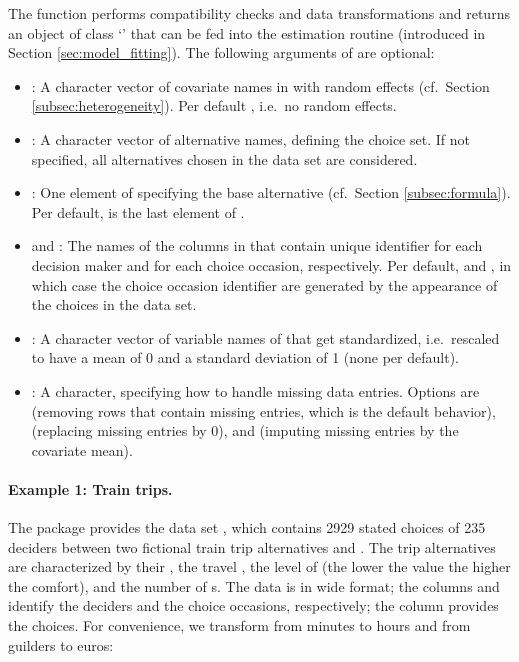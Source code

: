 \documentclass[article]{jss}
\newcommand{\class}[1]{`\code{#1}'}
\newcommand{\fct}[1]{\code{#1()}}
\begin{document}
The function performs compatibility checks and data transformations and returns an object of class \class{RprobitB\_data} that can be fed into the estimation routine \fct{fit\_model} (introduced in Section \ref{sec:model_fitting}). The following arguments of \fct{prepare\_data} are optional:
\begin{itemize}
  \item {}: A character vector of covariate names in  with random effects (cf.\ Section \ref{subsec:heterogeneity}). Per default , i.e.\ no random effects.
  \item {}: A character vector of alternative names, defining the choice set. If not specified, all alternatives chosen in the data set are considered.
  \item {}: One element of  specifying the base alternative (cf.\ Section \ref{subsec:formula}). Per default,  is the last element of .
  \item {} and : The names of the columns in  that contain unique identifier for each decision maker and for each choice occasion, respectively. Per default,  and , in which case the choice occasion identifier are generated by the appearance of the choices in the data set.
  \item {}: A character vector of variable names of  that get standardized, i.e.\ rescaled to have a mean of 0 and a standard deviation of 1 (none per default).
  \item {}: A character, specifying how to handle missing data entries. Options are  (removing rows that contain missing entries, which is the default behavior),  (replacing missing entries by 0), and  (imputing missing entries by the covariate mean).
\end{itemize}

\paragraph{Example 1: Train trips.}

The  package provides the data set , which contains 2929 stated choices of 235 deciders between two fictional train trip alternatives  and . The trip alternatives are characterized by their , the travel , the level of  (the lower the value the higher the comfort), and the number of s. The data is in wide format; the columns  and  identify the deciders and the choice occasions, respectively; the column  provides the choices. For convenience, we transform  from minutes to hours and  from guilders to euros:
\end{document}
